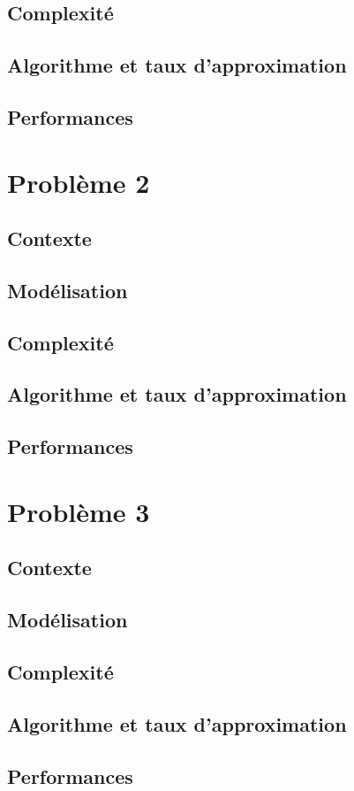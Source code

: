 \documentclass[11pt,french]{report}
\begin{document}
	\section{Complexité}
	
	\section{Algorithme et taux d'approximation}
	
	\section{Performances}
	\chapter{Problème 2}
	\section{Contexte}
	
	\section{Modélisation}
	
	\section{Complexité}
	
	\section{Algorithme et taux d'approximation}
	
	\section{Performances}
	
	\chapter{Problème 3}
	\section{Contexte}
	
	\section{Modélisation}
	
	\section{Complexité}
	
	\section{Algorithme et taux d'approximation}
	
	\section{Performances}

	
 
	
\end{document}
